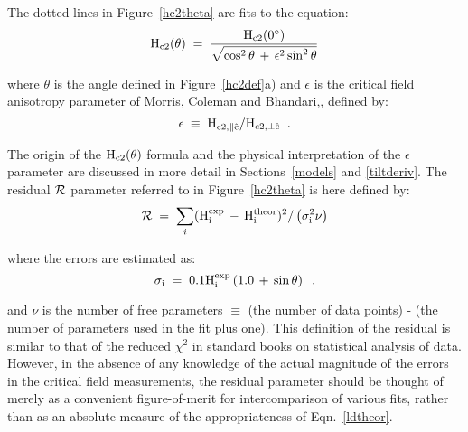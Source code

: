 	The   dotted  lines   in Figure~\ref{hc2theta}   are  fits to    the
equation:\\

\begin{equation}
\rm H_{c2}(\theta) \; = \; \frac{H_{c2}(0^{\circ})}{\sqrt{\cos^2\theta \,
+ \, \epsilon^2 \sin^2\theta}}
\label{ldtheor}
\end{equation}

\noindent where $\theta$ is the angle defined in Figure~\ref{hc2def}a) and
$\epsilon$ is the critical field anisotropy parameter of Morris, Coleman
and Bhandari,\cite{morris72}, defined by:\\

\[ \rm \epsilon \; \equiv \; H_{c2,\parallel \hat{c}}/ H_{c2,\perp \hat{c}} \; \; .
\]

\noindent  The origin of the $\rm H_{c2}(\theta)$ formula\cite{morris72,kats69}
and the physical interpretation  of the $\epsilon$  parameter are discussed
in more detail in Sections~\ref{models} and \ref{tiltderiv}.    The residual  $\cal R$  parameter referred  to in
Figure~\ref{hc2theta} is here defined by:\\


\begin{equation}
{\cal R} \; = \; \sum_i \rm (H_i^{exp} \, - \, H_i^{theor})^2 /
\left( \sigma_i^2 \nu \right)
\label{residef}
\end{equation}


\noindent where the errors are estimated as:\\
\[ \rm  \sigma_i  \; = \; 0.1  H_i^{\rm exp} \left(1.0 \, + \, \sin\theta
\right) \; \; .
\]

\noindent and  $\nu$ is the  number of free  parameters $\equiv$ (the number
of  data points) -  (the number of  parameters used in  the  fit plus one).
This definition of the residual is similar  to that of the reduced $\chi^2$
in   standard  books  on  statistical   analysis of data.\cite{bevington69}
However, in the absence of  any knowledge of  the  actual  magnitude of the
errors in the critical field measurements, the residual parameter should be
thought of merely  as  a convenient figure-of-merit  for intercomparison of
various fits, rather than as an absolute measure of the  appropriateness of
Eqn.~\ref{ldtheor}.

